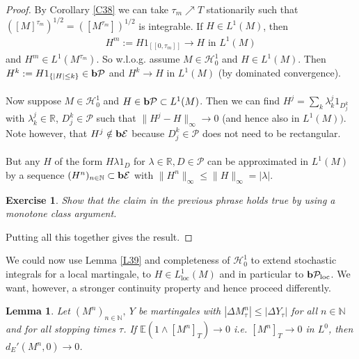 \documentclass[12pt,a4paper, twoside]{article}
\newtheorem{lem}{Lemma}[section]
\newtheorem{exe}{Exercise}[section]
\theoremstyle{definition}
\newcommand{\EE}{\mathbb{E}} %
\newcommand{\simple}{\textbf{\text{b}}\mathcal{E}}
\newcommand{\pred}{\textbf{\text{b}}\mathcal{P}}
\begin{document}
\begin{proof}
By Corollary \ref{C38} we can take $\tau_m \nearrow T$ stationarily such that $( [M]^{\tau_m})^{1/2} = ([M^{\tau_m}])^{1/2}$ is integrable. If $H \in L^1(M)$, then 
\begin{align*}
H^m:= H1_{ [\![ 0, \tau_m]\!]} \to H \text{ in } L^1(M)
\end{align*}
and $H^m \in L^1( M^{\tau_m}).$ So w.l.o.g. assume $M \in \mathcal{H}_0^1$ and $H \in L^1(M)$. Then $H^k := H 1_{\{ |H| \leq k \}} \in \pred$ and $H^k \to H$ in $L^1(M)$ (by dominated convergence). \\
\\
Now suppose $M \in \mathcal{H}_0^1$ and $H \in \pred \subset L^1(M)$. Then we can find $H^j = \sum_k \lambda_k^j 1_{D_j^k}$ with $\lambda_k^j \in \mathbb{R}$, $D_j^k \in \mathcal{P}$ such that $\|H^j-H\|_\infty \to 0$ (and hence also in $L^1(M))$. Note however, that $H^j \notin \simple$ because $D_j^k \in \mathcal{P}$ does not need to be rectangular. \\
\\
But any $H$ of the form $H \lambda 1_D$ for $\lambda \in \mathbb{R}, D \in \mathcal{P}$ can be approximated in $L^1(M)$ by a sequence $(H^n)_{n \in \mathbb{N}} \subset \simple$ with $\|H^n\|_\infty \leq \|H\|_\infty = | \lambda|$. 
\begin{exe} Show that the claim in the previous phrase holds true by using a monotone class argument. 
\end{exe}
\noindent Putting all this together gives the result. 
\end{proof}
\newpage
We could now use Lemma \ref{L39} and completeness of $\mathcal{H}_0^1$ to extend stochastic integrals for a local martingale, to $H \in L_\text{loc}^1(M)$ and in particular to $\pred_\text{loc}$. We want, however, a stronger continuity property and hence proceed differently. 
\begin{lem} \label{L310} Let $(M^n)_{n \in \mathbb{N}}, \ Y$ be martingales with $| \Delta M_\tau^n | \leq | \Delta Y_\tau |$ for all $n \in \mathbb{N}$ and for all stopping times $\tau$. If $\EE(1 \wedge [M^n]_T) \to 0$ i.e. $[M^n]_T \to 0$ in $L^0$, then $d_E' ( M^n,0 ) \to 0$. 
\end{lem}
\end{document}

